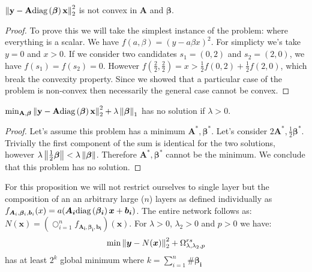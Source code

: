 \begin{proposition} \label{unconstrained_non_convex}
$     \left\lVert\bf{y} - \bf{A}\text{diag}\left(\bm{\beta}\right)\bf{x}\right\rVert_2^2
$ is not convex in $\bm{A}$ and $\bm{\beta}$.
\begin{proof}
  To prove this we will take the simplest instance of the problem: where everything is a scalar. We have $f(a, \beta) = \left(y - a\beta x\right)^2$. For simplicty we's take $y = 0$ and $x > 0$. If we consider two candidates $s_1 = (0, 2)$ and $s_2 = (2, 0)$, we have $f(s_1) = f(s_2) = 0$. However $f(\frac{2}{2}, \frac{2}{2}) = x > \frac{1}{2} f(0, 2) + \frac{1}{2}f(2, 0)$, which break the convexity property. Since we showed that a particular case of the problem is non-convex then necessarily the general case cannot be convex.
\end{proof}
\end{proposition}

\begin{proposition}
\label{unconstrained_shrinknet_no_min}
$     \min_{\bf{A}, \bm{\beta}} \left\lVert\bf{y} - \bf{A}\text{diag}\left(\bm{\beta}\right)\bf{x}\right\rVert_2^2 + \lambda \left\lVert\bm{\beta}\right\rVert_1
$
has no solution if $\lambda > 0$.
\end{proposition}
\begin{proof}
  Let's assume this problem has a minimum $\bm{A}^*, \bm{\beta}^*$. Let's consider $2\bm{A}^*, \frac{1}{2}\bm{\beta}^*$. Trivially the first component of the sum is identical for the two solutions, however $\lambda\left\lVert\frac{1}{2}\bm{\beta}\right\rVert < \lambda\left\lVert\bm{\beta}\right\rVert$. Therefore $\bm{A}^*, \bm{\beta}^*$ cannot be the minimum. We conclude that this problem has no solution.
\end{proof}
\begin{proposition}
  \label{shrinknet_regularized_minimum}
For this proposition we will not restrict ourselves to single layer but the composition of an an arbitrary large ($n$) layers as defined individually as $f_{\bm{A}_i, \bm{\beta}_i, \bm{b}_i}(x) = a(\bm{A_i}\text{diag}\left(\bm{\beta_i}\right)\bm{x} + \bm{b_i})$. The entire network follows as: $N(\bm{x}) = \left(\bigcirc_{i=1}^n f_{\bm{A_i}, \bm{\beta_i}, \bm{b_i}}\right)(\bm{x})$. For $\lambda > 0$, $\lambda_2 > 0$ and $p > 0$ we have:
  \begin{equation*}
    \min \left\lVert\bm{y} - N(\bm{x})\right\rVert_2^2 + \Omega_{\lambda, \lambda_2, p}^{rs}
  \end{equation*}
  has at least $2^k$ global minimum where $k = \sum_{i=1}^n \#\bm{\beta_i}$
\end{proposition}

